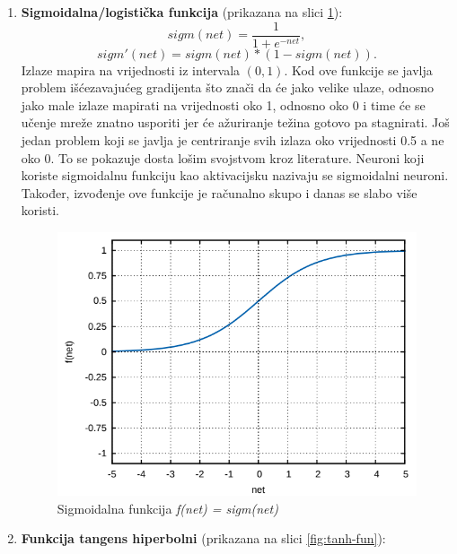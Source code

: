 \documentclass[times, utf8, zavrsni]{fer}
\begin{document}
\begin{enumerate}
    \item \textbf{Sigmoidalna/logistička funkcija} (prikazana na slici \ref{fig:sigm-fun}):
    \begin{equation}
        \label{eq:sigm}
        sigm(net) = \frac{1}{1 + e^{-net}},
    \end{equation}
    \begin{equation}
        \label{eq:sigm-der}
        sigm'(net) = sigm(net) * (1 - sigm(net)).
    \end{equation}
    Izlaze mapira na vrijednosti iz intervala $(0, 1)$. Kod ove funkcije se javlja problem išćezavajućeg gradijenta  što znači da će jako velike ulaze, odnosno jako male izlaze mapirati na vrijednosti oko 1, odnosno oko 0 i time će se učenje mreže znatno usporiti jer će ažuriranje težina gotovo pa stagnirati. Još jedan problem koji se javlja je centriranje svih izlaza oko vrijednosti 0.5 a ne oko 0. To se pokazuje dosta lošim svojstvom kroz literature. Neuroni koji koriste sigmoidalnu funkciju kao aktivacijsku nazivaju se sigmoidalni neuroni. Također, izvođenje ove funkcije je računalno skupo i danas se slabo više koristi.
    \begin{figure}[H]
        \centering
        \includegraphics[scale=0.5]{img/sigm-fun.png}
        \caption[Caption for LOF]{Sigmoidalna funkcija \textit{f(net) = sigm(net)}\footnotemark}
        \label{fig:sigm-fun}
    \end{figure}
    \item \textbf{Funkcija tangens hiperbolni} (prikazana na slici \ref{fig:tanh-fun}):

\end{enumerate}
\end{document}
